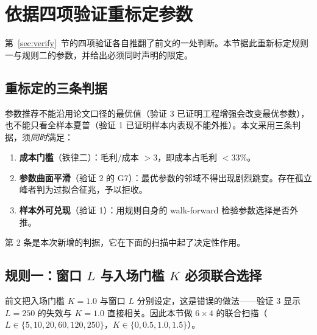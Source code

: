\section{依据四项验证重标定参数}\label{sec:retune}

第~\ref{sec:verify}~节的四项验证各自推翻了前文的一处判断。本节据此重新标定规则一与规则二的参数，并给出必须同时声明的限定。

\subsection{重标定的三条判据}

参数推荐不能沿用论文口径的最优值（验证 3 已证明工程增强会改变最优参数），也不能只看全样本夏普（验证 1 已证明样本内表现不能外推）。本文采用三条判据，须\emph{同时}满足：

\begin{enumerate}[leftmargin=2.2em]
  \item \textbf{成本门槛}（铁律二）：毛利/成本 $>3$，即成本占毛利 $<33\%$。
  \item \textbf{参数曲面平滑}（验证 2 的 G7）：最优参数的邻域不得出现剧烈跳变。存在孤立峰者判为过拟合征兆，予以拒收。
  \item \textbf{样本外可兑现}（验证 1）：用规则自身的 walk-forward 检验参数选择是否外推。
\end{enumerate}

第 2 条是本次新增的判据，它在下面的扫描中起了决定性作用。

\subsection{规则一：窗口 $L$ 与入场门槛 $K$ 必须联合选择}

前文把入场门槛 $K=1.0$ 与窗口 $L$ 分别设定，这是错误的做法——验证 3 显示 $L=250$ 的失效与 $K=1.0$ 直接相关。因此本节做 $6\times4$ 的联合扫描（$L\in\{5,10,20,60,120,250\}$，$K\in\{0,0.5,1.0,1.5\}$）。

